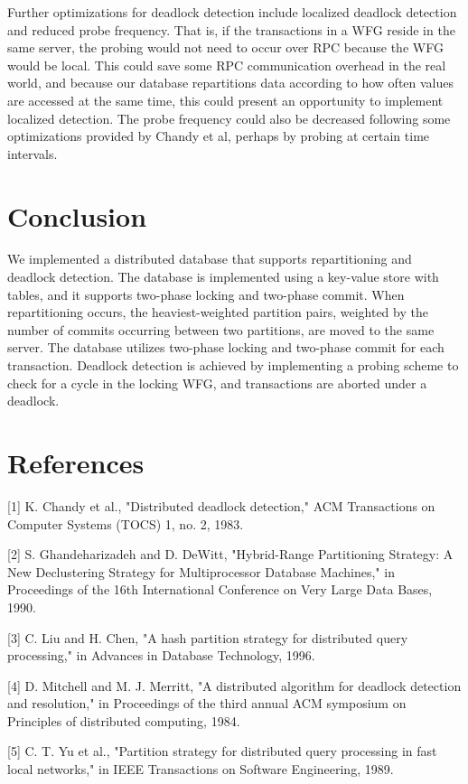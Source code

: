 \documentclass[a4paper, 10pt, notitlepage]{article}
\begin{document}
Further optimizations for deadlock detection include localized deadlock detection and reduced probe frequency. That is, if the transactions in a WFG reside in the same server, the probing would not need to occur over RPC because the WFG would be local. This could save some RPC communication overhead in the real world, and because our database repartitions data according to how often values are accessed at the same time, this could present an opportunity to implement localized detection. The probe frequency could also be decreased following some optimizations provided by Chandy et al, perhaps by probing at certain time intervals.


\section{Conclusion}
We implemented a distributed database that supports repartitioning and deadlock detection. The database is implemented using a key-value store with tables, and it supports two-phase locking and two-phase commit. When repartitioning occurs, the heaviest-weighted partition pairs, weighted by the number of commits occurring between two partitions, are moved to the same server. The database utilizes two-phase locking and two-phase commit for each transaction. Deadlock detection is achieved by implementing a probing scheme to check for a cycle in the locking WFG, and transactions are aborted under a deadlock.

\section{References}
[1]
K. Chandy et al., "Distributed deadlock detection," ACM Transactions on Computer Systems (TOCS) 1, no. 2, 1983.

[2]
S. Ghandeharizadeh and D. DeWitt, "Hybrid-Range Partitioning Strategy: A New Declustering Strategy for Multiprocessor Database Machines," in Proceedings of the 16th International Conference on Very Large Data Bases, 1990.

[3]
C. Liu and H. Chen, "A hash partition strategy for distributed query processing," in Advances in Database Technology, 1996.

[4]
D. Mitchell and M. J. Merritt, "A distributed algorithm for deadlock detection and resolution," in Proceedings of the third annual ACM symposium on Principles of distributed computing, 1984.

[5]
C. T. Yu et al., "Partition strategy for distributed query processing in fast local networks," in IEEE Transactions on Software Engineering, 1989.
\end{document}
